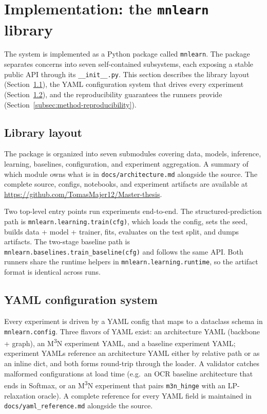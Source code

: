 \section{Implementation: the \texttt{mnlearn} library}
\label{sec:method-implementation}

The system is implemented as a Python package called
\texttt{mnlearn}. The package separates concerns into seven
self-contained subsystems, each exposing a stable public API
through its \texttt{\_\_init\_\_.py}. This section describes
the library layout (Section~\ref{subsec:method-lib-layout}),
the YAML configuration system that drives every experiment
(Section~\ref{subsec:method-yaml}), and the reproducibility
guarantees the runners provide
(Section~\ref{subsec:method-reproducibility}).

\subsection{Library layout}
\label{subsec:method-lib-layout}

The package is organized into seven submodules covering data,
models, inference, learning, baselines, configuration, and
experiment aggregation. A summary of which module owns what is
in \texttt{docs/architecture.md} alongside the source. The
complete source, configs, notebooks, and experiment artifacts
are available at
\url{https://github.com/TomasMajer12/Master-thesis}.

Two top-level entry points run experiments end-to-end. The
structured-prediction path is
\texttt{mnlearn.learning.train(cfg)}, which loads the config,
sets the seed, builds data + model + trainer, fits, evaluates
on the test split, and dumps artifacts. The two-stage baseline
path is \texttt{mnlearn.baselines.train\_baseline(cfg)} and
follows the same API. Both runners share the runtime helpers
in \texttt{mnlearn.learning.runtime}, so the artifact format is
identical across runs.

\subsection{YAML configuration system}
\label{subsec:method-yaml}

Every experiment is driven by a YAML config that maps to a
dataclass schema in \texttt{mnlearn.config}. Three flavors of
YAML exist: an architecture YAML (backbone + graph), an
M\textsuperscript{3}N experiment YAML, and a baseline
experiment YAML; experiment YAMLs reference an architecture
YAML either by relative path or as an inline dict, and both
forms round-trip through the loader. A validator catches
malformed configurations at load time (e.g.\ an OCR baseline
architecture that ends in Softmax, or an M\textsuperscript{3}N
experiment that pairs \texttt{m3n\_hinge} with an LP-relaxation
oracle). A complete reference for every YAML field is
maintained in \texttt{docs/yaml\_reference.md} alongside the
source.

